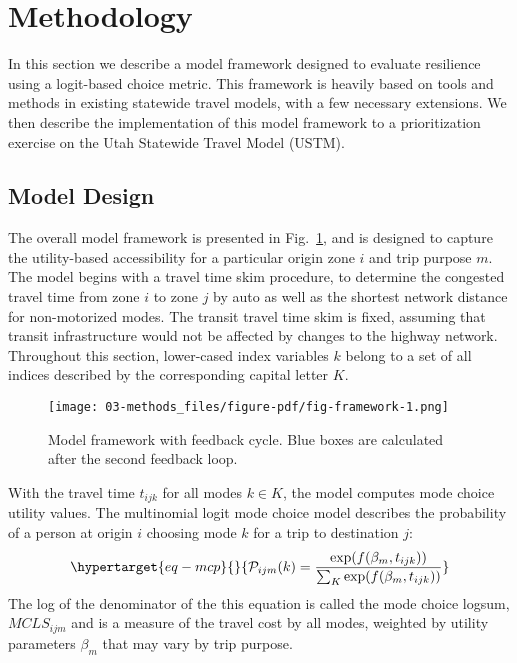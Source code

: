 \documentclass[]{ascelike-new}
\begin{document}
\hypertarget{methodology}{%
\section{Methodology}\label{methodology}}

In this section we describe a model framework designed to evaluate
resilience using a logit-based choice metric. This framework is heavily
based on tools and methods in existing statewide travel models, with a
few necessary extensions. We then describe the implementation of this
model framework to a prioritization exercise on the Utah Statewide
Travel Model (USTM).

\hypertarget{model-design}{%
\subsection{Model Design}\label{model-design}}

The overall model framework is presented in Fig.~\ref{fig-framework},
and is designed to capture the utility-based accessibility for a
particular origin zone \(i\) and trip purpose \(m\). The model begins
with a travel time skim procedure, to determine the congested travel
time from zone \(i\) to zone \(j\) by auto as well as the shortest
network distance for non-motorized modes. The transit travel time skim
is fixed, assuming that transit infrastructure would not be affected by
changes to the highway network. Throughout this section, lower-cased
index variables \(k\) belong to a set of all indices described by the
corresponding capital letter \(K\).

\begin{figure}

{\centering \texttt{[image: 03-methods\_files/figure-pdf/fig-framework-1.png]}

}

\caption{\label{fig-framework}Model framework with feedback cycle. Blue
boxes are calculated after the second feedback loop.}

\end{figure}

With the travel time \(t_{ijk}\) for all modes \(k \in K\), the model
computes mode choice utility values. The multinomial logit mode choice
model describes the probability of a person at origin \(i\) choosing
mode \(k\) for a trip to destination \(j\):
\begin{equation}\protect\hypertarget{eq-mcp}{}{
\mathcal{P}_{ijm}(k) = \frac{\exp(f(\beta_{m}, t_{ijk}))}{\sum_{K}\exp(f(\beta_{m}, t_{ijk}))}
}\label{eq-mcp}\end{equation} The log of the denominator of the this
equation is called the mode choice logsum, \(MCLS_{ijm}\) and is a
measure of the travel cost by all modes, weighted by utility parameters
\(\beta_m\) that may vary by trip purpose.
\end{document}
